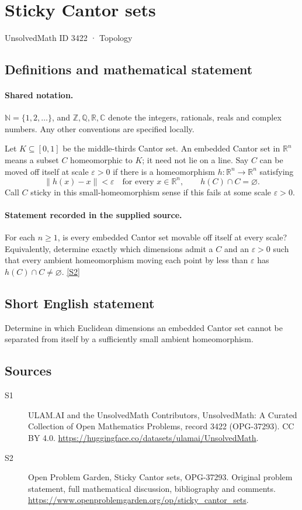 \documentclass[11pt]{article}
\newcommand{\sref}[2]{\hyperlink{source:#1:#2}{[S#2]}}
\begin{document}
\setcounter{section}{3421}
\section{Sticky Cantor sets}\label{3422}
{\small\sffamily UnsolvedMath ID 3422 · Topology}
\subsection{Definitions and mathematical statement}

\paragraph{Shared notation.}$\mathbb N=\{1,2,\ldots\}$, and $\mathbb Z,\mathbb Q,\mathbb R,\mathbb C$ denote the integers, rationals, reals and complex numbers. Any other conventions are specified locally.


Let $K\subseteq[0,1]$ be the middle-thirds Cantor set. An embedded Cantor set in $\mathbb R^n$ means a subset $C$ homeomorphic to $K$; it need not lie on a line. Say $C$ can be moved off itself at scale $\varepsilon>0$ if there is a homeomorphism $h:\mathbb R^n\to\mathbb R^n$ satisfying
\[
 \|h(x)-x\|<\varepsilon\quad\text{for every }x\in\mathbb R^n,
 \qquad h(C)\cap C=\varnothing.
\]
Call $C$ sticky in this small-homeomorphism sense if this fails at some scale $\varepsilon>0$.
\paragraph{Statement recorded in the supplied source.}
For each $n\ge1$, is every embedded Cantor set movable off itself at every scale? Equivalently, determine exactly which dimensions admit a $C$ and an $\varepsilon>0$ such that every ambient homeomorphism moving each point by less than $\varepsilon$ has $h(C)\cap C\ne\varnothing$. \sref{3422}{2}
\subsection{Short English statement}
Determine in which Euclidean dimensions an embedded Cantor set cannot be separated from itself by a sufficiently small ambient homeomorphism.
\subsection{Sources}
\begin{description}
\item[\hypertarget{source:3422:1}{S1}] ULAM.AI and the UnsolvedMath Contributors, UnsolvedMath: A Curated Collection of Open Mathematics Problems, record 3422 (OPG-37293). CC BY 4.0. \url{https://huggingface.co/datasets/ulamai/UnsolvedMath}.
\item[\hypertarget{source:3422:2}{S2}] Open Problem Garden, Sticky Cantor sets, OPG-37293. Original problem statement, full mathematical discussion, bibliography and comments. \url{https://www.openproblemgarden.org/op/sticky_cantor_sets}.
\end{description}
\label{end:3422}
\end{document}
